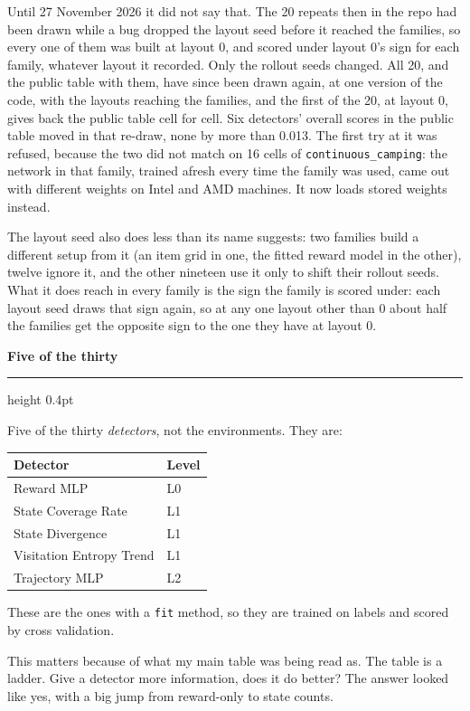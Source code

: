 \documentclass[11pt,a4paper]{article}
\newcommand{\code}[1]{\texttt{\small #1}}
\newcommand{\heading}[1]{%
  \par\vspace{1.5em}%
  \phantomsection\addcontentsline{toc}{section}{#1}%
  {\sffamily\bfseries\large #1}%
  \par\vspace{0.15em}%
  \hrule height 0.4pt%
  \par\vspace{0.5em}%
}
\begin{document}
Until 27 November 2026 it did not say that. The 20 repeats then in the repo had been
drawn while a bug dropped the layout seed before it reached the families, so every
one of them was built at layout 0, and scored under layout 0's sign for each family,
whatever layout it recorded. Only the rollout seeds changed. All 20, and the public
table with them, have since been drawn again, at one version of the code, with the
layouts reaching the families, and the first of the 20, at layout 0, gives back the
public table cell for cell. Six detectors' overall scores in the public table moved
in that re-draw, none by more than 0.013. The first try at it was refused, because
the two did not match on 16 cells of \code{continuous\_camping}: the network in that
family, trained afresh every time the family was used, came out with different
weights on Intel and AMD machines. It now loads stored weights instead.

The layout seed also does less than its name suggests: two families build a different
setup from it (an item grid in one, the fitted reward model in the other), twelve
ignore it, and the other nineteen use it only to shift their rollout seeds. What it
does reach in every family is the sign the family is scored under: each layout seed
draws that sign again, so at any one layout other than 0 about half the families get
the opposite sign to the one they have at layout 0.

\heading{Five of the thirty}
\label{h:five}

Five of the thirty \emph{detectors}, not the environments. They are:

\vspace{0.3em}
\begin{tabular}{@{}ll@{}}
\toprule
Detector & Level \\
\midrule
Reward MLP & L0 \\
State Coverage Rate & L1 \\
State Divergence & L1 \\
Visitation Entropy Trend & L1 \\
Trajectory MLP & L2 \\
\bottomrule
\end{tabular}
\vspace{0.3em}

These are the ones with a \code{fit} method, so they are trained on labels and
scored by cross validation.

This matters because of what my main table was being read as. The table is a
ladder. Give a detector more information, does it do better? The answer looked like
yes, with a big jump from reward-only to state counts.
\end{document}
